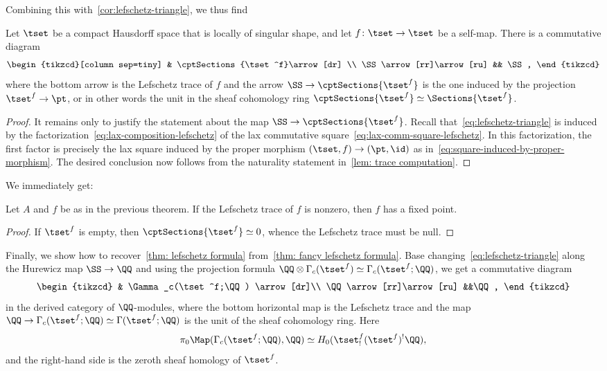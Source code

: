 Combining this with~\cref{cor:lefschetz-triangle}, we thus find
\begin{thm}\label{thm: fancy lefschetz formula}
  Let $\tset$ be a compact Hausdorff space that is locally of singular shape, and let $f\colon\tset\to\tset$ be a self-map. There is a commutative diagram
  \begin{equation}
    \label{eq:lefschetz-triangle}
    \begin{tikzcd}[column sep=tiny]
      & \cptSections{\tset^f}\arrow[dr] \\
      \SS\arrow[rr]\arrow[ru] && \SS,
    \end{tikzcd}
  \end{equation}
  where the bottom arrow is the Lefschetz trace of $f$ and the arrow $\SS\to\cptSections{\tset^f }$ is the one induced by the projection $\tset^f\to\pt$, or in other words the unit in the sheaf cohomology ring $\cptSections{\tset^f}\simeq\Sections{\tset^f}$.
\end{thm}
\begin{proof}
  It remains only to justify the statement about the map $\SS\to\cptSections{\tset^f}$. Recall that~\eqref{eq:lefschetz-triangle} is induced by the factorization~\eqref{eq:lax-composition-lefschetz} of the lax commutative square~\eqref{eq:lax-comm-square-lefschetz}. In this factorization, the first factor is precisely the lax square induced by the proper morphism $(\tset ,f)\to (\pt ,\id )$ as in~\eqref{eq:square-induced-by-proper-morphism}. The desired conclusion now follows from the naturality statement in~\cref{lem: trace computation}.
\end{proof}
We immediately get:
\begin{cor}
  Let $A$ and $f$ be as in the previous theorem. If the Lefschetz trace of $f$ is nonzero, then $f$ has a fixed point.
\end{cor}
\begin{proof}
  If $\tset^f$ is empty, then $\cptSections{\tset^f}\simeq 0$, whence the Lefschetz trace must be null.
\end{proof}
Finally, we show how to recover~\cref{thm: lefschetz formula} from~\cref{thm: fancy lefschetz formula}. Base changing~\eqref{eq:lefschetz-triangle} along the Hurewicz map $\SS\to\QQ$ and using the projection formula $\QQ\otimes\Gamma_c(\tset^f)\simeq \Gamma_c(\tset^f;\QQ )$, we get a commutative diagram
\[
  \begin{tikzcd}
    & \Gamma_c(\tset^f;\QQ ) \arrow[dr]\\
    \QQ\arrow[rr]\arrow[ru] &&\QQ,
  \end{tikzcd}
\]
in the derived category of $\QQ$-modules, where the bottom horizontal map is the Lefschetz trace and the map $\QQ\to\Gamma_c(\tset^f;\QQ )\simeq\Gamma (\tset^f;\QQ )$ is the unit of the sheaf cohomology ring.
Here
\[
\pi_0\Map (\Gamma_c (\tset^f;\QQ ),\QQ )\simeq H_0(\tset^f_!(\tset^f)^!\QQ ),
\]
and the right-hand side is the zeroth sheaf homology of $\tset^f$.

